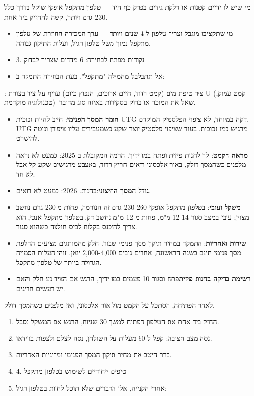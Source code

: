 \begin{tcbwarn}{מי שיש לו ידיים קטנות או דלקת גידים בפרק כף היד — טלפון מתקפל אופקי שוקל בדרך כלל 230 גרם ויותר, קשה להחזיק ביד אחת.}
\begin{itemize}
  \item מי שתקציבו מוגבל וצריך טלפון ל-4 שנים ויותר — ערך המכירה החוזרת של טלפון מתקפל נמוך משל טלפון רגיל, ועלות התיקון גבוהה.
  \item 3. נקודות מפתח לבחירה: 6 מדדים שצריך לבדוק
  \item אל תתבלבל מהמילה "מתקפל", בעת הבחירה התמקד ב:
\end{itemize}

\end{tcbwarn}


: ציר טיפת מים (קמט רדוד, חיים ארוכים, הנפוץ כיום) עדיף על ציר בצורת U (קמט עמוק, טכנולוגיה מוקדמת). שאל את המוכר או בדוק בסקירות באיזה סוג מדובר.

\begin{itemize}
  \item \textbf{חומר המסך הפנימי}: חייב להיות זכוכית UTG דקה במיוחד, לא ציפוי הפלסטיק המוקדם. UTG מרגיש כמו זכוכית, בעוד שציפוי פלסטיק יוצר שקע כשמעבירים עליו ציפורן ונוטה להישרט.
  \item \textbf{מראה הקמט}: לך לחנות פיזית ופתח במו ידיך. הרמה המקובלת ב-2025: כמעט לא נראה מלפנים כשהמסך דולק, באור אלכסוני רואים חריץ רדוד, באצבע מרגישים שקע קל אבל לא חד.
  \item \textbf{גודל המסך החיצוני}:בחנות. 2026: כמעט לא רואים.
  \item \textbf{משקל ועובי}: בטלפון מתקפל אופקי 230-260 גרם זה הנורמה, פחות מ-230 גרם נחשב מצוין; עובי במצב סגור 12-14 מ"מ, פחות מ-12 מ"מ נחשב דק. בטלפון מתקפל אנכי, הוא צריך להיכנס בקלות לכיס חולצה כשהוא סגור.
  \item \textbf{שירות ואחריות}: התמקד במחיר תיקון מסך פנימי שבור. חלק מהמותגים מציעים החלפת מסך פנימי חינם בשנה הראשונה, אחרים גובים 2,000-4,000 יואן. זוהי העלות הסמויה הגדולה ביותר של טלפון מתקפל.
  \item \textbf{רשימת בדיקה בחנות פיזית}פתח וסגור 10 פעמים במו ידיך, הרגש אם הציר נע חלק והאם יש רעשים חריגים.
\end{itemize}

\begin{tcbpractice}{לאחר הפתיחה, הסתכל על הקמט מול אור אלכסוני, ואז מלפנים כשהמסך דולק.}
\begin{enumerate}
  \item החזק ביד אחת את הטלפון הפתוח למשך 30 שניות, הרגש אם המשקל נסבל.
  \item נסה מצב חצובה: קפל ל-90 מעלות על השולחן, נסה לצלם ולצפות בווידאו.
  \item ברר היטב את מחיר תיקון המסך הפנימי ומדיניות האחריות.
  \item 4. טיפים ייחודיים לשימוש בטלפון מתקפל
  \item אחרי הקנייה, אלו הדברים שלא תוכל לחוות בטלפון רגיל:
\end{enumerate}

\end{tcbpractice}


